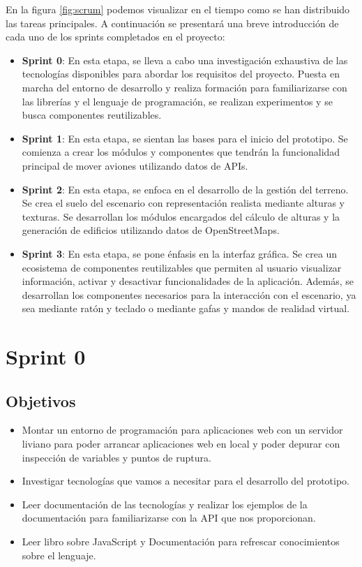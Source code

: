 \documentclass[a4paper, 11pt]{book}
\begin{document}
En la figura \ref{fig:scrum} podemos visualizar en el tiempo como se han distribuido las tareas principales. A continuación se presentará una breve introducción de cada uno de los sprints completados en el proyecto:

\begin{itemize}
    \item \textbf{Sprint 0}: En esta etapa, se lleva a cabo una investigación exhaustiva de las tecnologías disponibles para abordar los requisitos del proyecto. Puesta en marcha del entorno de desarrollo y realiza formación para familiarizarse con las librerías y el lenguaje de programación, se realizan experimentos y se busca componentes reutilizables.
    \item \textbf{Sprint 1}: En esta etapa, se sientan las bases para el inicio del prototipo. Se comienza a crear los módulos y componentes que tendrán la funcionalidad principal de mover aviones utilizando datos de APIs.
    \item \textbf{Sprint 2}: En esta etapa, se enfoca en el desarrollo de la gestión del terreno. Se crea el suelo del escenario con representación realista mediante alturas y texturas. Se desarrollan los módulos encargados del cálculo de alturas y la generación de edificios utilizando datos de OpenStreetMaps.
    \item \textbf{Sprint 3}: En esta etapa, se pone énfasis en la interfaz gráfica. Se crea un ecosistema de componentes reutilizables que permiten al usuario visualizar información, activar y desactivar funcionalidades de la aplicación. Además, se desarrollan los componentes necesarios para la interacción con el escenario, ya sea mediante ratón y teclado o mediante gafas y mandos de realidad virtual.
\end{itemize}

\section{Sprint 0}
\subsection{Objetivos}
\begin{itemize}
    \item Montar un entorno de programación para aplicaciones web con un servidor liviano para poder arrancar aplicaciones web en local y poder depurar con inspección de variables y puntos de ruptura.
    \item Investigar tecnologías que vamos a necesitar para el desarrollo del prototipo.
    \item Leer documentación de las tecnologías y realizar los ejemplos de la documentación para familiarizarse con la API que nos proporcionan.
    \item Leer libro sobre JavaScript y Documentación para refrescar conocimientos sobre el lenguaje.
\end{itemize}
\end{document}

